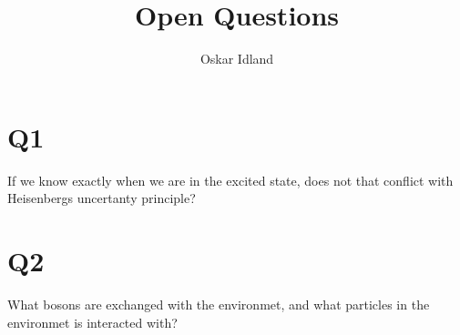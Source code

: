 \documentclass{article}
\author{Oskar Idland}
\title{Open Questions}
\date{}
\begin{document}
\maketitle
\newpage
\section*{Q1}
If we know exactly when we are in the excited state, does not that conflict with Heisenbergs uncertanty principle? 

\section*{Q2}
What bosons are exchanged with the environmet, and what particles in the environmet is interacted with?
\end{document}
